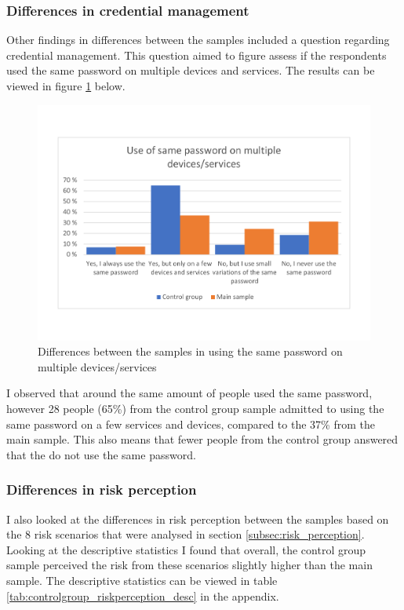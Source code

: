 \subsubsection{Differences in credential management}
Other findings in differences between the samples included a question regarding credential management. This question aimed to figure assess if the respondents used the same password on multiple devices and services. The results can be viewed in figure \ref{fig:controlgroup_samepassword} below. 
\begin{figure}[!h]
    \centering
    \includegraphics[scale=0.40]{figures/diagrams/controlgroup_samepassword.pdf}
    \caption{Differences between the samples in using the same password on multiple devices/services}
    \label{fig:controlgroup_samepassword}
\end{figure}
I observed that around the same amount of people used the same password, however 28 people (65\%) from the control group sample admitted to using the same password on a few services and devices, compared to the 37\% from the main sample. This also means that fewer people from the control group answered that the do not use the same password. 

\subsubsection{Differences in risk perception}
I also looked at the differences in risk perception between the samples based on the 8 risk scenarios that were analysed in section \ref{subsec:risk_perception}. Looking at the descriptive statistics I found that overall, the control group sample perceived the risk from these scenarios slightly higher than the main sample. The descriptive statistics can be viewed in table \ref{tab:controlgroup_riskperception_desc} in the appendix. 